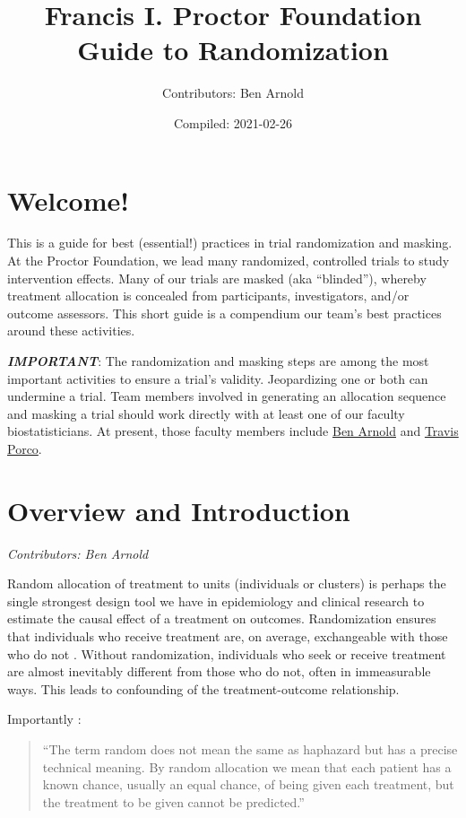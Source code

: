 \documentclass[
]{book}
\title{Francis I. Proctor Foundation Guide to Randomization}
\author{Contributors: Ben Arnold}
\date{Compiled: 2021-02-26}
\begin{document}
\maketitle

{
\setcounter{tocdepth}{1}
\tableofcontents
}
\hypertarget{welcome}{%
\chapter*{Welcome!}\label{welcome}}

This is a guide for best (essential!) practices in trial randomization and masking. At the Proctor Foundation, we lead many randomized, controlled trials to study intervention effects. Many of our trials are masked (aka ``blinded''), whereby treatment allocation is concealed from participants, investigators, and/or outcome assessors. This short guide is a compendium our team's best practices around these activities.

\emph{\textbf{IMPORTANT}}: The randomization and masking steps are among the most important activities to ensure a trial's validity. Jeopardizing one or both can undermine a trial. Team members involved in generating an allocation sequence and masking a trial should work directly with at least one of our faculty biostatisticians. At present, those faculty members include \href{https://profiles.ucsf.edu/benjamin.arnold}{Ben Arnold} and \href{https://profiles.ucsf.edu/travis.porco}{Travis Porco}.

\hypertarget{overview}{%
\chapter{Overview and Introduction}\label{overview}}

\emph{Contributors: Ben Arnold}

Random allocation of treatment to units (individuals or clusters) is perhaps the single strongest design tool we have in epidemiology and clinical research to estimate the causal effect of a treatment on outcomes. Randomization ensures that individuals who receive treatment are, on average, exchangeable with those who do not \citep{Altman1999-zc}. Without randomization, individuals who seek or receive treatment are almost inevitably different from those who do not, often in immeasurable ways. This leads to confounding of the treatment-outcome relationship.

Importantly \citep{Altman1999-zc}:

\begin{quote}
``The term random does not mean the same as haphazard but has a precise technical meaning. By random allocation we mean that each patient has a known chance, usually an equal chance, of being given each treatment, but the treatment to be given cannot be predicted.''
\end{quote}
\end{document}
